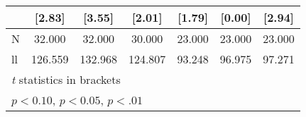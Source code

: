 {\begin{tabular}{l*{6}{c}}
                    &      [2.83]        &      [3.55]        &      [2.01]        &      [1.79]        &      [0.00]        &      [2.94]        \\
\hline
N                   &      32.000        &      32.000        &      30.000        &      23.000        &      23.000        &      23.000        \\
ll                  &     126.559        &     132.968        &     124.807        &      93.248        &      96.975        &      97.271        \\
\hline\hline
\multicolumn{7}{l}{\footnotesize \textit{t} statistics in brackets}\\
\multicolumn{7}{l}{\footnotesize \sym{+} \(p<0.10\), \sym{*} \(p<0.05\), \sym{**} \(p<.01\)}\\
\end{tabular}
}
